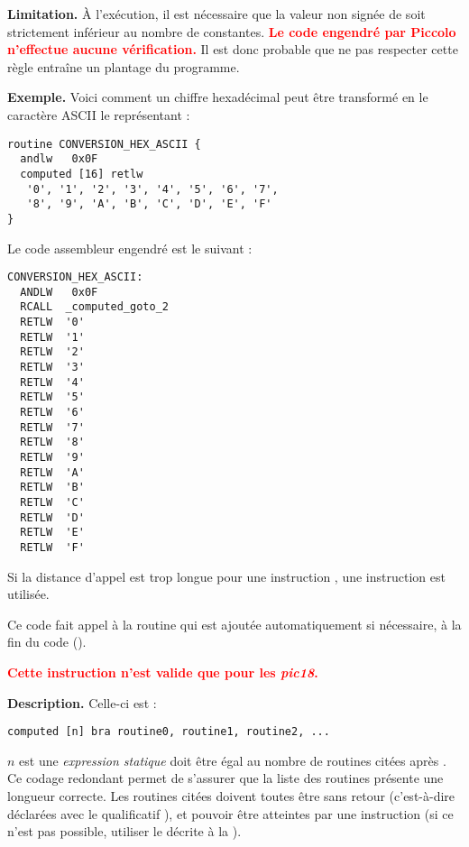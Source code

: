 \textbf{Limitation.} À l'exécution, il est nécessaire que la valeur non signée de  soit strictement inférieur au nombre de constantes. \textcolor{red}{\bf Le code engendré par Piccolo n'effectue aucune vérification.} Il est donc probable que ne pas respecter cette règle entraîne un plantage du programme.


\textbf{Exemple.} Voici comment un chiffre hexadécimal peut être transformé en le caractère ASCII le représentant :
\begin{lstlisting}[language=piccolo]
routine CONVERSION_HEX_ASCII {
  andlw   0x0F
  computed [16] retlw
   '0', '1', '2', '3', '4', '5', '6', '7',
   '8', '9', 'A', 'B', 'C', 'D', 'E', 'F'
}
\end{lstlisting}

Le code assembleur engendré est le suivant :
\begin{lstlisting}[language=assembleur]
CONVERSION_HEX_ASCII:
  ANDLW   0x0F
  RCALL  _computed_goto_2
  RETLW  '0'
  RETLW  '1'
  RETLW  '2'
  RETLW  '3'
  RETLW  '4'
  RETLW  '5'
  RETLW  '6'
  RETLW  '7'
  RETLW  '8'
  RETLW  '9'
  RETLW  'A'
  RETLW  'B'
  RETLW  'C'
  RETLW  'D'
  RETLW  'E'
  RETLW  'F'
\end{lstlisting}

Si la distance d'appel est trop longue pour une instruction , une instruction  est utilisée.

Ce code fait appel à la routine  qui est ajoutée automatiquement si nécessaire, à la fin du code (). 


\textcolor{red}{\bf Cette instruction n'est valide que pour les \emph{pic18}.}

\textbf{Description.} Celle-ci est :
\begin{lstlisting}[language=piccolo]
computed [n] bra routine0, routine1, routine2, ...
\end{lstlisting}

$n$ est une \emph{expression statique} doit être égal au nombre de routines citées après . Ce codage redondant permet de s'assurer que la liste des routines présente une longueur correcte. Les routines citées doivent toutes être sans retour (c'est-à-dire déclarées avec le qualificatif ), et pouvoir être atteintes par une instruction  (si ce n'est pas possible, utiliser le  décrite à la ).

